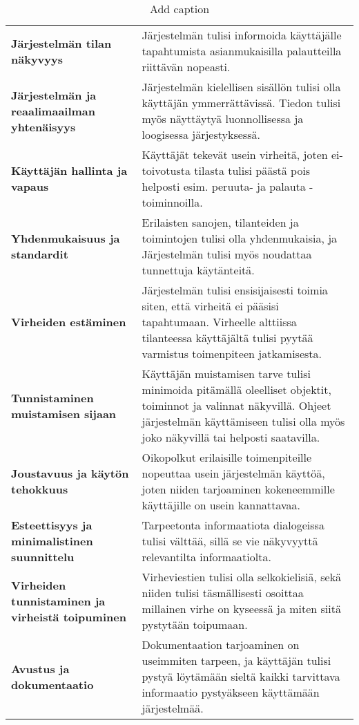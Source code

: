 \documentclass[utf8]{gradu3}
\begin{document}
\begin{table}[htbp]
  \centering
  \caption{Add caption}
    \begin{tabular}{p{12.355em}p{21.855em}}
    \multicolumn{1}{l}{\textbf{Järjestelmän tilan näkyvyys}} & Järjestelmän tulisi informoida käyttäjälle tapahtumista asianmukaisilla palautteilla riittävän nopeasti. \\
    \textbf{Järjestelmän ja reaalimaailman yhtenäisyys} & Järjestelmän kielellisen sisällön tulisi olla käyttäjän ymmerrättävissä. Tiedon tulisi myös näyttäytyä luonnollisessa ja loogisessa järjestyksessä. \\
    \multicolumn{1}{l}{\textbf{Käyttäjän hallinta ja vapaus}} & Käyttäjät tekevät usein virheitä, joten ei-toivotusta tilasta tulisi päästä pois helposti esim. peruuta- ja palauta -toiminnoilla. \\
    \multicolumn{1}{l}{\textbf{Yhdenmukaisuus ja standardit}} & Erilaisten sanojen, tilanteiden ja toimintojen tulisi olla yhdenmukaisia, ja Järjestelmän tulisi myös noudattaa tunnettuja käytänteitä. \\
    \multicolumn{1}{l}{\textbf{Virheiden estäminen}} & Järjestelmän tulisi ensisijaisesti toimia siten, että virheitä ei pääsisi tapahtumaan. Virheelle alttiissa tilanteessa käyttäjältä tulisi pyytää varmistus toimenpiteen jatkamisesta. \\
    \textbf{Tunnistaminen muistamisen sijaan} & Käyttäjän muistamisen tarve tulisi minimoida pitämällä oleelliset objektit, toiminnot ja valinnat näkyvillä. Ohjeet järjestelmän käyttämiseen tulisi olla myös joko näkyvillä tai helposti saatavilla. \\
    \multicolumn{1}{l}{\textbf{Joustavuus ja käytön tehokkuus}} & Oikopolkut erilaisille toimenpiteille nopeuttaa usein järjestelmän käyttöä, joten niiden tarjoaminen kokeneemmille käyttäjille on usein kannattavaa.  \\
    \textbf{Esteettisyys ja minimalistinen suunnittelu} & Tarpeetonta informaatiota dialogeissa tulisi välttää, sillä se vie näkyvyyttä relevantilta informaatiolta. \\
    \textbf{Virheiden tunnistaminen ja virheistä toipuminen} & Virheviestien tulisi olla selkokielisiä, sekä niiden tulisi täsmällisesti osoittaa millainen virhe on kyseessä ja miten siitä pystytään toipumaan. \\
    \textbf{Avustus ja dokumentaatio} & Dokumentaation tarjoaminen on useimmiten tarpeen, ja käyttäjän tulisi pystyä löytämään sieltä kaikki tarvittava informaatio pystyäkseen käyttämään järjestelmää. \\
    \end{tabular}%
  \label{tab:addlabel}%
\end{table}%
\end{document}
